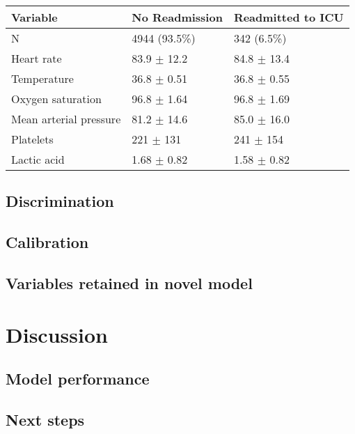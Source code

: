 \documentclass[onecolumn]{article}
\begin{document}
\begin{table*}[hb]
\centering
	\renewcommand{\arraystretch}{1.4}
		\caption{}%
	\begin{tabular}{lp{2.5cm}p{2cm}}
		\hline
		Variable & No Readmission & Readmitted to ICU\\
		\hline
		N & 4944 (93.5\%)  &      342 (6.5\%)\\
		Heart rate & 83.9 $\pm$ 12.2 & 84.8 $\pm$ 13.4\\
		Temperature & 36.8 $\pm$ 0.51 &  36.8 $\pm$ 0.55\\
		Oxygen saturation & 96.8 $\pm$ 1.64 & 96.8 $\pm$ 1.69\\
		Mean arterial pressure & 81.2 $\pm$ 14.6 & 85.0 $\pm$ 16.0\\
		Platelets & 221 $\pm$ 131 & 241 $\pm$ 154\\
		Lactic acid & 1.68 $\pm$ 0.82 & 1.58 $\pm$ 0.82\\
		\hline
	\end{tabular}
	\label{Table1Fialho}
\end{table*}





\subsection{Discrimination}


\subsection{Calibration}


\subsection{Variables retained in novel model}

\section{Discussion}

\subsection{Model performance}


\subsection{Next steps}


\begin{multicols}{2}

{\small
}

\end{multicols}
\end{document}

